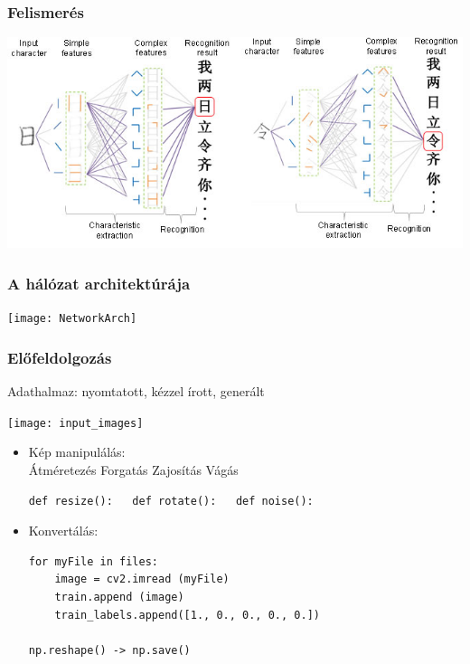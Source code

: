 \documentclass{beamer}
\newcommand\tab[1][1cm]{\hspace*{#1}}
\begin{document}
\begin{frame}[fragile]
\frametitle{Felismerés}

\includegraphics[scale=0.485]{CNN_CCR_working}

\end{frame}

\begin{frame}[fragile]
\frametitle{A hálózat architektúrája}

\begin{center}
	\texttt{[image: NetworkArch]}
\end{center}

\end{frame}


\begin{frame}[fragile]
\frametitle{Előfeldolgozás}

Adathalmaz: nyomtatott, kézzel írott, generált

\medskip

\texttt{[image: input\_images]}

\begin{itemize}
\item Kép manipulálás:\\
Átméretezés \tab Forgatás \tab Zajosítás \tab Vágás\\
\begin{lstlisting} 
def resize():	def rotate():	def noise():
\end{lstlisting}
\item Konvertálás:\\
\begin{lstlisting}
for myFile in files:
    image = cv2.imread (myFile)
    train.append (image)
    train_labels.append([1., 0., 0., 0., 0.])
    
np.reshape() -> np.save()
\end{lstlisting}
\end{itemize}

\end{frame}
\end{document}
